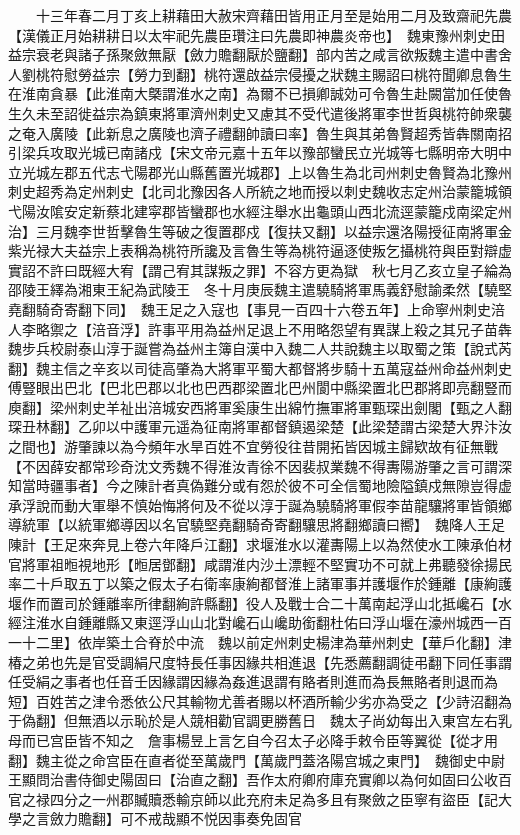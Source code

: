　　十三年春二月丁亥上耕藉田大赦宋齊藉田皆用正月至是始用二月及致齋祀先農【漢儀正月始耕耕日以太牢祀先農臣瓚注曰先農即神農炎帝也】　魏東豫州刺史田益宗衰老與諸子孫聚斂無厭【斂力贍翻厭於鹽翻】部内苦之咸言欲叛魏主遣中書舍人劉桃符慰勞益宗【勞力到翻】桃符還啟益宗侵擾之狀魏主賜詔曰桃符聞卿息魯生在淮南貪暴【此淮南大槩謂淮水之南】為爾不已損卿誠効可令魯生赴闕當加任使魯生久未至詔徙益宗為鎮東將軍濟州刺史又慮其不受代遣後將軍李世哲與桃符帥衆襲之奄入廣陵【此新息之廣陵也濟子禮翻帥讀曰率】魯生與其弟魯賢超秀皆犇關南招引梁兵攻取光城已南諸戍【宋文帝元嘉十五年以豫部蠻民立光城等七縣明帝大明中立光城左郡五代志弋陽郡光山縣舊置光城郡】上以魯生為北司州刺史魯賢為北豫州刺史超秀為定州刺史【北司北豫因各人所統之地而授以刺史魏收志定州治蒙籠城領弋陽汝隂安定新蔡北建寜郡皆蠻郡也水經注舉水出龜頭山西北流逕蒙籠戍南梁定州治】三月魏李世哲擊魯生等破之復置郡戍【復扶又翻】以益宗還洛陽授征南將軍金紫光禄大夫益宗上表稱為桃符所讒及言魯生等為桃符逼逐使叛乞攝桃符與臣對辯虚實詔不許曰既經大宥【謂己宥其謀叛之罪】不容方更為獄　秋七月乙亥立皇子綸為邵陵王繹為湘東王紀為武陵王　冬十月庚辰魏主遣驍騎將軍馬義舒慰諭柔然【驍堅堯翻騎奇寄翻下同】　魏王足之入寇也【事見一百四十六卷五年】上命寧州刺史涪人李略禦之【涪音浮】許事平用為益州足退上不用略怨望有異謀上殺之其兄子苗犇魏步兵校尉泰山淳于誕嘗為益州主簿自漢中入魏二人共說魏主以取蜀之策【說式芮翻】魏主信之辛亥以司徒高肇為大將軍平蜀大都督將步騎十五萬寇益州命益州刺史傅豎眼出巴北【巴北巴郡以北也巴西郡梁置北巴州閬中縣梁置北巴郡將即亮翻豎而庾翻】梁州刺史羊祉出涪城安西將軍奚康生出綿竹撫軍將軍甄琛出劍閣【甄之人翻琛丑林翻】乙卯以中護軍元遥為征南將軍都督鎮遏梁楚【此梁楚謂古梁楚大界汴汝之間也】游肇諫以為今頻年水旱百姓不宜勞役往昔開拓皆因城主歸欵故有征無戰【不因薛安都常珍奇沈文秀魏不得淮汝青徐不因裴叔業魏不得夀陽游肇之言可謂深知當時疆事者】今之陳計者真偽難分或有怨於彼不可全信蜀地險隘鎮戍無隙豈得虚承浮說而動大軍舉不慎始悔將何及不從以淳于誕為驍騎將軍假李苗龍驤將軍皆領鄉導統軍【以統軍鄉導因以名官驍堅堯翻騎奇寄翻驤思將翻鄉讀曰嚮】　魏降人王足陳計【王足來奔見上卷六年降戶江翻】求堰淮水以灌夀陽上以為然使水工陳承伯材官將軍祖暅視地形【暅居鄧翻】咸謂淮内沙土漂輕不堅實功不可就上弗聽發徐揚民率二十戶取五丁以築之假太子右衛率康絢都督淮上諸軍事并護堰作於鍾離【康絢護堰作而置司於鍾離率所律翻絢許縣翻】役人及戰士合二十萬南起浮山北抵巉石【水經注淮水自鍾離縣又東逕浮山山北對巉石山巉助銜翻杜佑曰浮山堰在濠州城西一百一十二里】依岸築土合脊於中流　魏以前定州刺史楊津為華州刺史【華戶化翻】津椿之弟也先是官受調絹尺度特長任事因緣共相進退【先悉薦翻調徒弔翻下同任事謂任受絹之事者也任音壬因緣謂因緣為姦進退謂有賂者則進而為長無賂者則退而為短】百姓苦之津令悉依公尺其輸物尤善者賜以杯酒所輸少劣亦為受之【少詩沼翻為于偽翻】但無酒以示恥於是人競相勸官調更勝舊日　魏太子尚幼每出入東宫左右乳母而已宫臣皆不知之　詹事楊昱上言乞自今召太子必降手敕令臣等翼從【從才用翻】魏主從之命宫臣在直者從至萬歲門【萬歲門蓋洛陽宫城之東門】　魏御史中尉王顯問治書侍御史陽固曰【治直之翻】吾作太府卿府庫充實卿以為何如固曰公收百官之禄四分之一州郡贓贖悉輸京師以此充府未足為多且有聚斂之臣寧有盜臣【記大學之言斂力贍翻】可不戒哉顯不悦因事奏免固官

